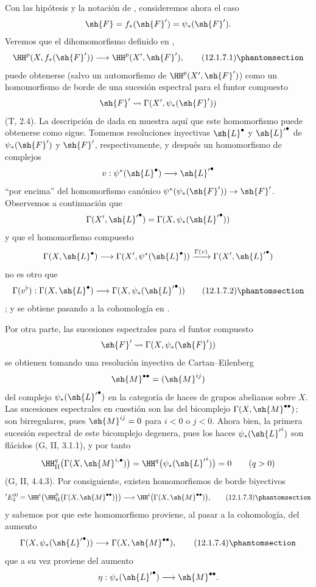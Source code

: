 \documentclass[oneside]{amsart}
\makeatletter
\newcommand{\ega@arrow}[2]{\mathchoice{#1}{#2}{#2}{#2}}
\renewcommand{\to}{\ega@arrow{\longrightarrow}{\rightarrow}}
\newcommand{\oldpage}[2][]{{\marginnote{\normalfont\textbf{#1}~|~#2}}\ignorespaces}
\let\EGAOriginalLabel\label
\renewcommand{\label}[1]{\phantomsection\EGAOriginalLabel{#1}}
\makeatother
\begin{document}
\begin{env}[12.1.7]
\label{0.12.1.7}
Con las hipótesis y la notación de , consideremos ahora el
caso
\[
  \sh{F}=f_*(\sh{F}')=\psi_*(\sh{F}').
\]
Veremos que el dihomomorfismo definido en ,
\[
  \HH^p(X,f_*(\sh{F}'))\longrightarrow\HH^p(X',\sh{F}'),
  \tag{12.1.7.1}
  \label{0.12.1.7.1}
\]
puede obtenerse (salvo un automorfismo de $\HH^p(X',\sh{F}')$) como un
homomorfismo de borde de una sucesión espectral para el funtor compuesto
\[
  \sh{F}'\leadsto\Gamma(X',\psi_*(\sh{F}'))
\]
(T, 2.4).
La descripción de  dada en  muestra
aquí que este homomorfismo puede obtenerse como sigue.
Tomemos resoluciones inyectivas $\sh{L}^\bullet$ y
${\sh{L}'}^\bullet$ de $\psi_*(\sh{F}')$ y $\sh{F}'$,
respectivamente, y después un homomorfismo de complejos
\[
  v:\psi^*(\sh{L}^\bullet)\longrightarrow{\sh{L}'}^\bullet
\]
``por encima'' del homomorfismo canónico
$\psi^*(\psi_*(\sh{F}'))\to\sh{F}'$.
\oldpage[0\textsubscript{III}]{56}
Observemos a continuación que
\[
  \Gamma(X',{\sh{L}'}^\bullet)
  =\Gamma(X,\psi_*({\sh{L}'}^\bullet))
\]
y que el homomorfismo compuesto
\[
  \Gamma(X,\sh{L}^\bullet)
  \longrightarrow\Gamma(X',\psi^*(\sh{L}^\bullet))
  \xrightarrow{\Gamma(v)}\Gamma(X',{\sh{L}'}^\bullet)
\]
no es otro que
\[
  \Gamma(v^\flat):
  \Gamma(X,\sh{L}^\bullet)
  \longrightarrow\Gamma(X,\psi_*({\sh{L}'}^\bullet))
  \tag{12.1.7.2}
  \label{0.12.1.7.2}
\]
; y  se
obtiene pasando a la cohomología en .

Por otra parte, las sucesiones espectrales para el funtor compuesto
\[
  \sh{F}'\leadsto\Gamma(X,\psi_*(\sh{F}'))
\]
se obtienen tomando una resolución inyectiva de Cartan--Eilenberg
\[
  \sh{M}^{\bullet\bullet}=(\sh{M}^{ij})
\]
del complejo $\psi_*({\sh{L}'}^\bullet)$ en la categoría de
haces de grupos abelianos sobre $X$.
Las sucesiones espectrales en cuestión son las del bicomplejo
$\Gamma(X,\sh{M}^{\bullet\bullet})$; son birregulares, pues
$\sh{M}^{ij}=0$ para $i<0$ o $j<0$.
Ahora bien, la primera sucesión espectral de este bicomplejo degenera, pues
los haces $\psi_*({\sh{L}'}^i)$ son flácidos (G, II, 3.1.1), y
por tanto
\[
  \HH_\mathrm{II}^q
    \bigl(\Gamma(X,\sh{M}^{i,\bullet})\bigr)
  =\HH^q\bigl(\psi_*({\sh{L}'}^i)\bigr)=0
  \qquad(q>0)
\]
(G, II, 4.4.3).
Por consiguiente, existen homomorfismos de borde biyectivos
\[
  {}'E_2^{i0}
  =\HH^i\!\left(
      \HH_\mathrm{II}^0
        \bigl(\Gamma(X,\sh{M}^{\bullet\bullet})\bigr)
    \right)
  \longrightarrow
  \HH^i\bigl(\Gamma(X,\sh{M}^{\bullet\bullet})\bigr),
  \tag{12.1.7.3}
  \label{0.12.1.7.3}
\]
y sabemos por  que este homomorfismo proviene, al pasar
a la cohomología, del aumento
\[
  \Gamma(X,\psi_*({\sh{L}'}^\bullet))
  \longrightarrow\Gamma(X,\sh{M}^{\bullet\bullet}),
  \tag{12.1.7.4}
  \label{0.12.1.7.4}
\]
que a su vez proviene del aumento
\[
  \eta:\psi_*({\sh{L}'}^\bullet)
  \longrightarrow\sh{M}^{\bullet\bullet}.
\]


\end{env}
\end{document}
